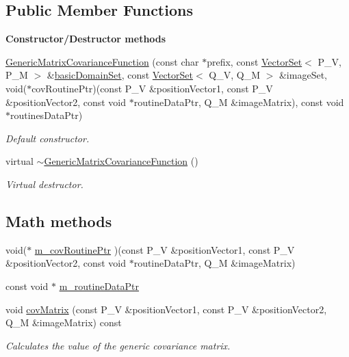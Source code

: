 \subsection*{Public Member Functions}
\begin{Indent}{\bf Constructor/\-Destructor methods}\par
\begin{DoxyCompactItemize}
\item 
\hyperlink{class_q_u_e_s_o_1_1_generic_matrix_covariance_function_ade7c8ddfe0c9cfbf1ac3d3233249e0f7}{Generic\-Matrix\-Covariance\-Function} (const char $\ast$prefix, const \hyperlink{class_q_u_e_s_o_1_1_vector_set}{Vector\-Set}$<$ P\-\_\-\-V, P\-\_\-\-M $>$ \&\hyperlink{class_q_u_e_s_o_1_1_base_matrix_covariance_function_a6ce876e4dae5ab4b165ac100e310dd45}{basic\-Domain\-Set}, const \hyperlink{class_q_u_e_s_o_1_1_vector_set}{Vector\-Set}$<$ Q\-\_\-\-V, Q\-\_\-\-M $>$ \&image\-Set, void($\ast$cov\-Routine\-Ptr)(const P\-\_\-\-V \&position\-Vector1, const P\-\_\-\-V \&position\-Vector2, const void $\ast$routine\-Data\-Ptr, Q\-\_\-\-M \&image\-Matrix), const void $\ast$routines\-Data\-Ptr)
\begin{DoxyCompactList}\small\item\em Default constructor. \end{DoxyCompactList}\item 
virtual \hyperlink{class_q_u_e_s_o_1_1_generic_matrix_covariance_function_a148ab4380b8d299c5418b333a80c5039}{$\sim$\-Generic\-Matrix\-Covariance\-Function} ()
\begin{DoxyCompactList}\small\item\em Virtual destructor. \end{DoxyCompactList}\end{DoxyCompactItemize}
\end{Indent}
\subsection*{Math methods}
\begin{DoxyCompactItemize}
\item 
void($\ast$ \hyperlink{class_q_u_e_s_o_1_1_generic_matrix_covariance_function_a6841d2f9abbc3c31e0809c18d790777c}{m\-\_\-cov\-Routine\-Ptr} )(const P\-\_\-\-V \&position\-Vector1, const P\-\_\-\-V \&position\-Vector2, const void $\ast$routine\-Data\-Ptr, Q\-\_\-\-M \&image\-Matrix)
\item 
const void $\ast$ \hyperlink{class_q_u_e_s_o_1_1_generic_matrix_covariance_function_a54dbb7157e6a1be651d6467a00d6a8cd}{m\-\_\-routine\-Data\-Ptr}
\item 
void \hyperlink{class_q_u_e_s_o_1_1_generic_matrix_covariance_function_ad1dc99df94d6fb77aa658fda06fd832d}{cov\-Matrix} (const P\-\_\-\-V \&position\-Vector1, const P\-\_\-\-V \&position\-Vector2, Q\-\_\-\-M \&image\-Matrix) const 
\begin{DoxyCompactList}\small\item\em Calculates the value of the generic covariance matrix. \end{DoxyCompactList}\end{DoxyCompactItemize}
